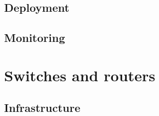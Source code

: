 \documentclass[a4paper,12pt]{article}
\begin{document}
\subsection{Deployment}

\subsection{Monitoring}


\section{Switches and routers}

\subsection{Infrastructure}
\end{document}
